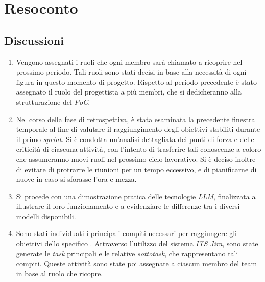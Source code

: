 \section{Resoconto} \label{sec:resoconto}
\subsection{Discussioni} \label{subsec:resdiscussione}
\begin{enumerate}
    \item Vengono assegnati i ruoli che ogni membro sarà chiamato a ricoprire nel prossimo periodo. Tali ruoli sono stati decisi in base alla necessità di ogni figura in questo momento di progetto. Rispetto al periodo precedente è stato assegnato il ruolo del progettista a più membri, che si dedicheranno alla strutturazione del \emph{PoC}.
    \item Nel corso della fase di retrospettiva, è stata esaminata la precedente finestra temporale al fine di valutare il raggiungimento degli obiettivi stabiliti durante il primo \emph{sprint}. Si è condotta un'analisi dettagliata dei punti di forza e delle criticità di ciascuna attività, con l'intento di trasferire tali conoscenze a coloro che assumeranno nuovi ruoli nel prossimo ciclo lavorativo.
    Si è deciso inoltre di evitare di protrarre le riunioni per un tempo eccessivo, e di pianificarne di nuove in caso si sforasse l'ora e mezza.
    \item Si procede con una dimostrazione pratica delle tecnologie \emph{LLM}, finalizzata a illustrare il loro funzionamento e a evidenziare le differenze tra i diversi modelli disponibili.
    \item Sono stati individuati i principali compiti necessari per raggiungere gli obiettivi dello specifico . Attraverso l'utilizzo del sistema \emph{ITS} \emph{Jira}, sono state generate le \emph{task} principali e le relative \emph{sottotask}, che rappresentano tali compiti. Queste attività sono state poi assegnate a ciascun membro del team in base al ruolo che ricopre.
    
\end{enumerate}

